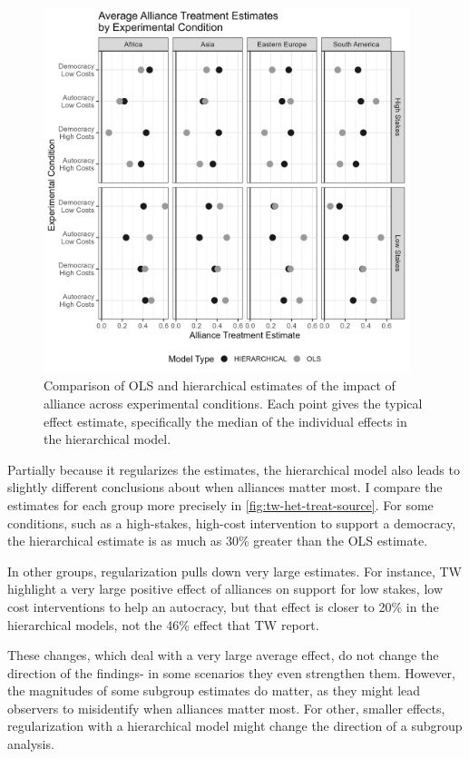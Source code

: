 \documentclass[12pt]{article}
\begin{document}
\begin{figure}[htpb]
	\centering
		\includegraphics[width=0.95\textwidth]{../figures/tw-het-treat-source.png}
	\caption{Comparison of OLS and hierarchical estimates of the impact of alliance across experimental conditions. Each point gives the typical effect estimate, specifically the median of the individual effects in the hierarchical model.}
	\label{fig:tw-het-treat-source}
\end{figure}


Partially because it regularizes the estimates, the hierarchical model also leads to slightly different conclusions about when alliances matter most.
I compare the estimates for each group more precisely in \autoref{fig:tw-het-treat-source}.
For some conditions, such as a high-stakes, high-cost intervention to support a democracy, the hierarchical estimate is as much as 30\% greater than the OLS estimate. 


In other groups, regularization pulls down very large estimates. 
For instance, TW highlight a very large positive effect of alliances on support for low stakes, low cost interventions to help an autocracy, but that effect is closer to 20\% in the hierarchical models, not the 46\% effect that TW report. 


These changes, which deal with a very large average effect, do not change the direction of the findings- in some scenarios they even strengthen them. 
However, the magnitudes of some subgroup estimates do matter, as they might lead observers to misidentify when alliances matter most.
For other, smaller effects, regularization with a hierarchical model might change the direction of a subgroup analysis. 
\end{document}
